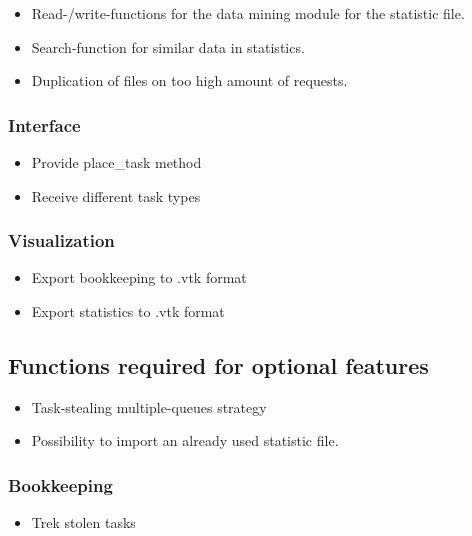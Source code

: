 {			%
			\begin{itemize}
				
				\item Read-/write-functions for the data mining module for the statistic file.
				\item Search-function for similar data in statistics.
				\item Duplication of files on too high amount of requests.
			\end{itemize}
	
	
	\subsubsection{Interface}
	
		\begin{itemize}
			\item Provide place\_task method
			\item Receive different task types
		\end{itemize}
		
		
	\subsubsection{Visualization}
	
		\begin{itemize}
			\item Export bookkeeping to .vtk format
			\item Export statistics to .vtk format
		\end{itemize}
		
	\subsection{Functions required for optional features}
	
		\begin{itemize}
			\item Task-stealing multiple-queues strategy%
			\item Possibility to import an already used statistic file.%
		\end{itemize}
		
	\subsubsection{Bookkeeping}
		\begin{itemize}
			\item Trek stolen tasks
		\end{itemize}
		
}
